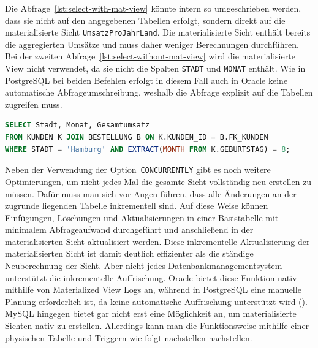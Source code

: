 Die Abfrage~\ref{lst:select-with-mat-view} könnte intern so umgeschrieben werden, dass sie nicht auf den angegebenen Tabellen erfolgt, sondern direkt auf die materialisierte Sicht \texttt{UmsatzProJahrLand}.
Die materialisierte Sicht enthält bereits die aggregierten Umsätze und muss daher weniger Berechnungen durchführen.
Bei der zweiten Abfrage~\ref{lst:select-without-mat-view} wird die materialisierte View nicht verwendet, da sie nicht die Spalten \texttt{STADT} und \texttt{MONAT} enthält.
Wie in PostgreSQL bei beiden Befehlen erfolgt in diesem Fall auch in Oracle keine automatische Abfrageumschreibung, weshalb die Abfrage explizit auf die Tabellen zugreifen muss.

\vspace{-5pt}
\begin{lstlisting}[language=SQL,caption=Select nicht mit Materialized View,label={lst:select-without-mat-view}]
SELECT Stadt, Monat, Gesamtumsatz
FROM KUNDEN K JOIN BESTELLUNG B ON K.KUNDEN_ID = B.FK_KUNDEN
WHERE STADT = 'Hamburg' AND EXTRACT(MONTH FROM K.GEBURTSTAG) = 8;
\end{lstlisting}
\vspace{-5pt}

Neben der Verwendung der Option~\texttt{CONCURRENTLY} gibt es noch weitere Optimierungen, um nicht jedes Mal die gesamte Sicht vollständig neu erstellen zu müssen.
Dafür muss man sich vor Augen führen, dass alle Änderungen an der zugrunde liegenden Tabelle inkrementell sind.
Auf diese Weise können Einfügungen, Löschungen und Aktualisierungen in einer Basistabelle mit minimalem Abfrageaufwand durchgeführt und anschließend in der materialisierten Sicht aktualisiert werden.
Diese inkrementelle Aktualisierung der materialisierten Sicht ist damit deutlich effizienter als die ständige Neuberechnung der Sicht.
Aber nicht jedes Datenbankmanagementsystem unterstützt die inkrementelle Auffrischung.
Oracle bietet diese Funktion nativ mithilfe von Materialized View Logs an, während in PostgreSQL eine manuelle Planung erforderlich ist, da keine automatische Auffrischung unterstützt wird (\cite{mat_view_features_per_db}).
MySQL hingegen bietet gar nicht erst eine Möglichkeit an, um materialisierte Sichten nativ zu erstellen.
Allerdings kann man die Funktionsweise mithilfe einer physischen Tabelle und Triggern wie folgt nachstellen nachstellen.

